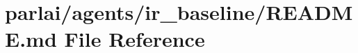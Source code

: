 \hypertarget{parlai_2agents_2ir__baseline_2README_8md}{}\section{parlai/agents/ir\+\_\+baseline/\+R\+E\+A\+D\+ME.md File Reference}
\label{parlai_2agents_2ir__baseline_2README_8md}
